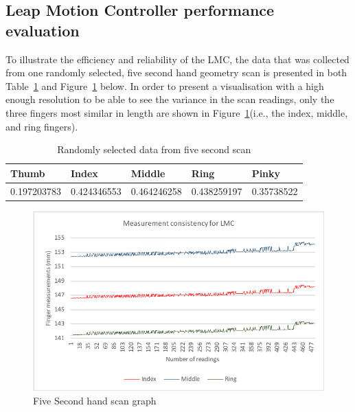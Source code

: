 \subsection{Leap Motion Controller performance evaluation}

To illustrate the efficiency and reliability of the LMC, the data that was collected from one randomly selected, five second hand geometry scan is presented in both Table~\ref{table: Randomly selected data from five second scan} and Figure~\ref{fig:Five Second hand scan graph} below. 
In order to present a visualisation with a high enough resolution to be able to see the variance in the scan readings, only the three fingers most similar in length are shown in Figure~\ref{fig:Five Second hand scan graph}(i.e., the index, middle, and ring fingers). 

    
    \begin{table}[h!]
    \caption{Randomly selected data from five second scan}
    \centering
     \begin{tabular}{|p{} | p{}| p{}| p{}| p{}|} 
     \hline
    	\textbf{Thumb} & \textbf{Index} & \textbf{Middle} & \textbf{Ring} & \textbf{Pinky} \\ [1ex] 
     \hline\hline 
     0.197203783 & 0.424346553 &  0.464246258 & 0.438259197 & 0.35738522 \\[1ex]
     \hline 
     \end{tabular}
     \label{table: Randomly selected data from five second scan}
    \end{table}

    
    \begin{figure}[htbp!] 
    \centering    
    \includegraphics[width=1.0\textwidth]{Chapter4/Figs/Consistency.png}
    \caption[Five Second hand scan graph]{Five Second hand scan graph}
    \label{fig:Five Second hand scan graph}
    \end{figure}
    
